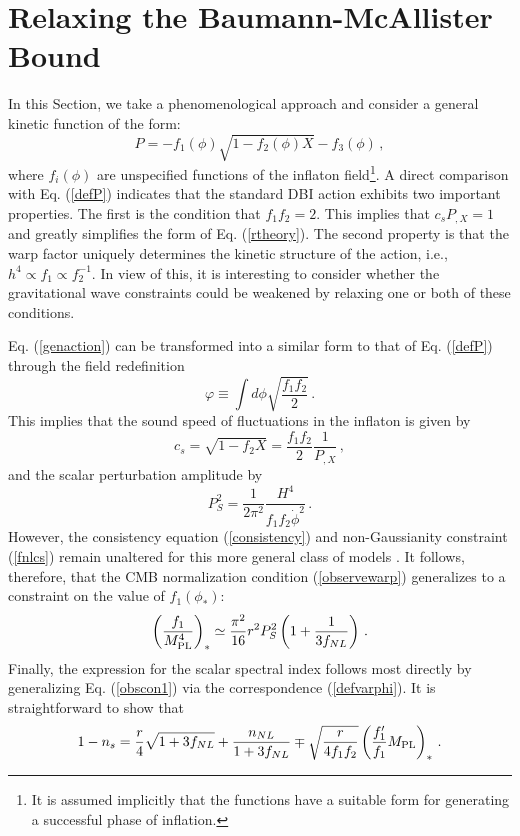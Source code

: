 \section{Relaxing the Baumann-McAllister Bound}
% 
\label{sec:satisfy}
% 
In this Section, we take a phenomenological 
approach and consider a general kinetic function of the form:
\begin{equation}
\label{genaction}
P= -f_1 (\phi ) \sqrt{1-f_2 (\phi ) X} -f_3 (\phi) \,,
\end{equation}
where $f_i (\phi )$ are unspecified functions of the inflaton 
field\footnote{It is assumed 
implicitly that the functions have a suitable form for 
generating a successful phase of inflation.}.
A direct comparison with Eq. (\ref{defP}) 
indicates that the standard DBI action exhibits two important properties. 
The first is the condition that $f_1 f_2 =2$. This implies that 
$c_sP_{,X} =1$ and greatly simplifies the form of Eq. (\ref{rtheory}). 
The second property is that the warp factor uniquely determines 
the kinetic structure of the action, i.e., $h^4 \propto f_1 \propto f_2^{-1}$.  
In view of this, it is interesting to consider whether
the gravitational wave constraints could be weakened by relaxing one 
or both of these conditions. 

Eq. (\ref{genaction}) 
can be transformed into a similar form to that of 
Eq. (\ref{defP}) through the field redefinition 
\begin{equation}
\label{defvarphi}
\varphi \equiv \int d \phi \sqrt{\frac{f_1f_2}{2}}  \,.
\end{equation}
This implies that the sound speed of fluctuations in 
the inflaton is given by 
\begin{equation}
\label{generalspeed}
c_s = \sqrt{1-f_2 X} = \frac{f_1f_2}{2} \frac{1}{P_{,X}}  \,,
\end{equation}
and the scalar perturbation amplitude by 
\begin{equation}
\label{genamp}
P_S^2 = \frac{1}{2\pi^2}\frac{H^4}{f_1f_2\dot{\phi}^2}  \,.
\end{equation}
However, the consistency equation (\ref{consistency}) and 
non-Gaussianity constraint (\ref{fnlcs}) remain unaltered 
for this more general class 
of models \cite{lidser2}. It 
follows, therefore, 
that the CMB normalization condition (\ref{observewarp}) 
generalizes to a constraint on the value of $f_1 (\phi_*)$:  
\begin{equation}
\label{observef1}
\left( \frac{f_1}{M_{\mathrm{PL}}^4} \right)_{*} \simeq \frac{\pi^2}{16} r^2P_S^2
\left( 1+ \frac{1}{3f_{NL}} \right)  \,.
\end{equation}
Finally, the expression for the scalar spectral index
follows most directly by generalizing Eq. (\ref{obscon1}) 
via the correspondence (\ref{defvarphi}). It  
is straightforward to show that 
\begin{equation}
\label{constraintW}
1-n_s = \frac{r}{4} \sqrt{1+3f_{NL}}
 +\frac{n_{NL}}{1+3f_{NL} } \mp \sqrt{\frac{r}{4f_1f_2}} \left( 
\frac{f_1'}{f_1} M_{\mathrm{PL}} \right)_*  \,.
\end{equation}

